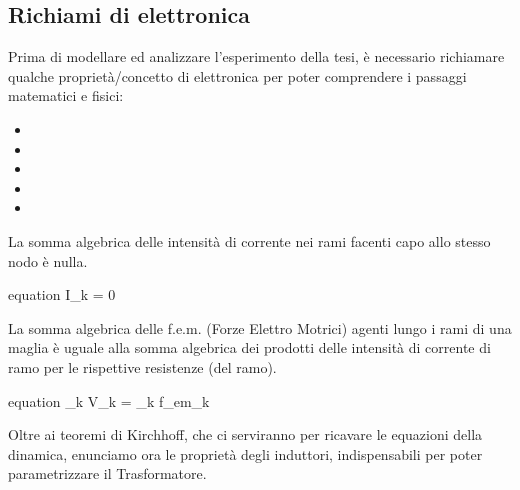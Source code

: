 \subsection{Richiami di elettronica}
Prima di modellare ed analizzare l'esperimento della tesi, è necessario richiamare qualche proprietà/concetto di elettronica per poter comprendere i passaggi matematici e fisici:
\vspace{-5mm}
\begin{itemize}[itemsep=-4mm]
	\item {}
	\item {}
	\item {}
	\item {}
	\item {}
\end{itemize}


\begin{teorema}
	La somma algebrica delle intensità di corrente nei rami facenti capo allo stesso nodo è nulla.
	\begin{empheq}[box=\mathResult]{equation} \label{eq:KirchhoffNodi}
		\sum I_k = 0
	\end{empheq}
\end{teorema}

\begin{teorema}
	La somma algebrica delle f.e.m. (Forze Elettro Motrici) agenti lungo i rami di una maglia è uguale alla somma algebrica dei prodotti delle intensità di corrente di ramo per le rispettive resistenze (del ramo).
	\begin{empheq}[box=\mathResult]{equation} \label{eq:KirchhoffMaglie}
		\sum_{\forall k} V_k = \sum_{\forall k} f_{em_k}
	\end{empheq}
\end{teorema}
\vspace{-3mm}
\noindent
Oltre ai teoremi di Kirchhoff, che ci serviranno per ricavare le equazioni della dinamica, enunciamo ora le proprietà degli induttori, indispensabili per poter parametrizzare il Trasformatore.

